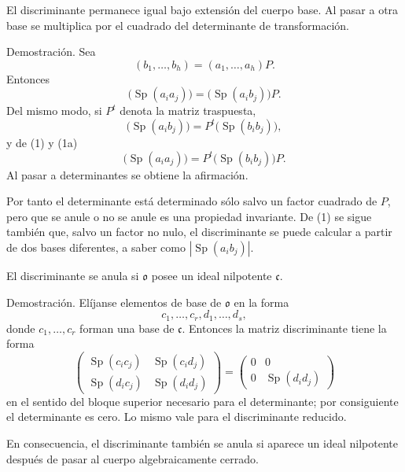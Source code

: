 \documentclass[11pt]{article}
\providecommand{\mo}{\mathfrak{o}}
\providecommand{\mc}{\mathfrak{c}}
\begin{document}
El discriminante permanece igual bajo extensión del cuerpo base. Al pasar a otra base se multiplica por el cuadrado del determinante de transformación.

Demostración. Sea
\[
        (b_1,\ldots,b_h)=(a_1,\ldots,a_h)P.
\]
Entonces
\[
        \bigl(\operatorname{Sp}(a_i a_j)\bigr)=\bigl(\operatorname{Sp}(a_i b_j)\bigr)P.       \tag{1}
\]
Del mismo modo, si $P^t$ denota la matriz traspuesta,
\[
        \bigl(\operatorname{Sp}(a_i b_j)\bigr)=P^t\bigl(\operatorname{Sp}(b_i b_j)\bigr),      \tag{1a}
\]
y de (1) y (1a)
\[
        \bigl(\operatorname{Sp}(a_i a_j)\bigr)=P^t\bigl(\operatorname{Sp}(b_i b_j)\bigr)P.
\]
Al pasar a determinantes se obtiene la afirmación.

Por tanto el determinante está determinado sólo salvo un factor cuadrado de $P$, pero que se anule o no se anule es una propiedad invariante. De (1) se sigue también que, salvo un factor no nulo, el discriminante se puede calcular a partir de dos bases diferentes, a saber como $|\operatorname{Sp}(a_i b_j)|$.

El discriminante se anula si $\mo$ posee un ideal nilpotente $\mc$.

Demostración. Elíjanse elementos de base de $\mo$ en la forma
\[
        c_1,\ldots,c_r,d_1,\ldots,d_s,
\]
donde $c_1,\ldots,c_r$ forman una base de $\mc$. Entonces la matriz discriminante tiene la forma
\[
        \begin{pmatrix}
        \operatorname{Sp}(c_i c_j)&\operatorname{Sp}(c_i d_j)\\
        \operatorname{Sp}(d_i c_j)&\operatorname{Sp}(d_i d_j)
        \end{pmatrix}
        =
        \begin{pmatrix}
        0&0\\
        0&\operatorname{Sp}(d_i d_j)
        \end{pmatrix}
\]
en el sentido del bloque superior necesario para el determinante; por consiguiente el determinante es cero. Lo mismo vale para el discriminante reducido.

En consecuencia, el discriminante también se anula si aparece un ideal nilpotente después de pasar al cuerpo algebraicamente cerrado.
\end{document}
